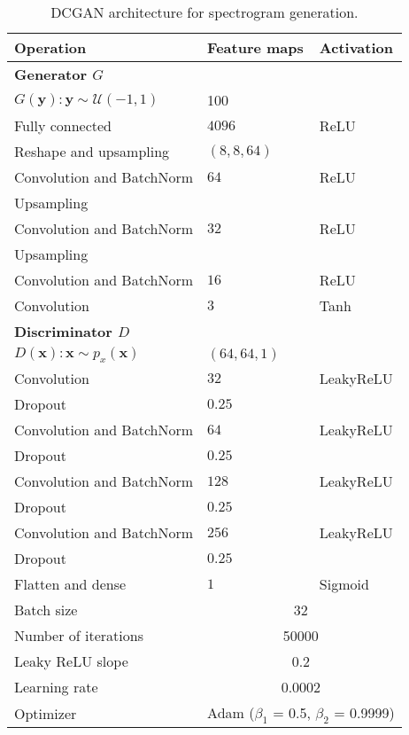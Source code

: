 \begin{table}
	\centering
	\caption{DCGAN architecture for spectrogram generation.}
	\begin{tabular}{ p{5cm}|p{3cm}|p{3cm}} 
		\toprule
		Operation & Feature maps  		& Activation  \\
		\midrule
		\textbf{Generator $G$} &&   \\ 
		$G(\mathbf{y}):\mathbf{y} \sim \mathcal{U}(-1,1)$ & 100\\ 
		Fully connected & $4096$ & ReLU \\ 
		Reshape and upsampling & $(8,8,64)$ &  \\ 
		Convolution and BatchNorm & $64$ & ReLU \\ 
		Upsampling & &  \\ 
		Convolution and BatchNorm & $32$ & ReLU \\ 
		Upsampling & &  \\ 
		Convolution and BatchNorm & $16$ & ReLU \\ 
		Convolution & $3$ & Tanh \\  \hline
		
		\textbf{Discriminator $D$} & &  \\ 
		$D(\mathbf{x}):\mathbf{x} \sim p_x(\mathbf{x})$ & $(64,64,1)$ \\ 
		Convolution & $32$ & LeakyReLU \\ 
		Dropout & $0.25$ &  \\ 
		Convolution and BatchNorm & $64$ & LeakyReLU \\ 
		Dropout & $0.25$ &  \\ 
		Convolution and BatchNorm & $128$ & LeakyReLU \\ 
		Dropout & $0.25$ &  \\ 
		Convolution and BatchNorm & $256$ & LeakyReLU \\ 
		Dropout & $0.25$ &  \\ 
		Flatten and dense & $1$ & Sigmoid \\   \hline
		
		Batch size & \multicolumn{2}{c}{32} \\
		Number of iterations & \multicolumn{2}{c}{50000} \\ 
		Leaky ReLU slope &  \multicolumn{2}{c}{0.2} \\ 
		Learning rate &  \multicolumn{2}{c}{0.0002}  \\ 
		Optimizer &  \multicolumn{2}{c}{Adam ($\beta_1$ = 0.5, $\beta_2$ = 0.9999)}  \\ \hline
	\end{tabular}
	\label{tab:DCGAN_parameters}
\end{table}

